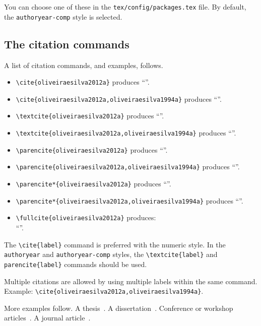 You can choose one of these in the \verb+tex/config/packages.tex+ file.
By default, the \verb+authoryear-comp+ style is selected.


\subsection{The citation commands}
\label{c3:ss:the-citation-commands}

A list of citation commands, and examples, follows.

\begin{itemize}
\item
\verb+\cite{oliveiraesilva2012a}+ produces ``\cite{oliveiraesilva2012a}''.
\item
\verb+\cite{oliveiraesilva2012a,oliveiraesilva1994a}+ produces ``\cite{oliveiraesilva2012a,oliveiraesilva1994a}''.
\item
\verb+\textcite{oliveiraesilva2012a}+ produces ``\textcite{oliveiraesilva2012a}''.
\item
\verb+\textcite{oliveiraesilva2012a,oliveiraesilva1994a}+ produces ``\textcite{oliveiraesilva2012a,oliveiraesilva1994a}''.
\item
\verb+\parencite{oliveiraesilva2012a}+ produces ``\parencite{oliveiraesilva2012a}''.
\item
\verb+\parencite{oliveiraesilva2012a,oliveiraesilva1994a}+ produces ``\parencite{oliveiraesilva2012a,oliveiraesilva1994a}''.
\item
\verb+\parencite*{oliveiraesilva2012a}+ produces ``\parencite*{oliveiraesilva2012a}''.
\item
\verb+\parencite*{oliveiraesilva2012a,oliveiraesilva1994a}+ produces ``\parencite*{oliveiraesilva2012a,oliveiraesilva1994a}''.
\item
\verb+\fullcite{oliveiraesilva2012a}+ produces:\\``''.
\end{itemize}

The \verb+\cite{label}+ command is preferred with the numeric style.
In the \texttt{authoryear} and \texttt{authoryear-comp} styles, the \verb+\textcite{label}+ and \verb+parencite{label}+ commands should be used.

Multiple citations are allowed by using multiple labels within the same command.
Example: \verb+\cite{oliveiraesilva2012a,oliveiraesilva1994a}+.

More examples follow.
A  thesis~\parencite{oliveiraesilva1994a}.
A  dissertation~\parencite{antunes2015a}.
Conference or workshop articles~\parencite{antunes2019a,antunes2020a,almeida2021a}.
A journal article~\parencite{antunes2019b}.


